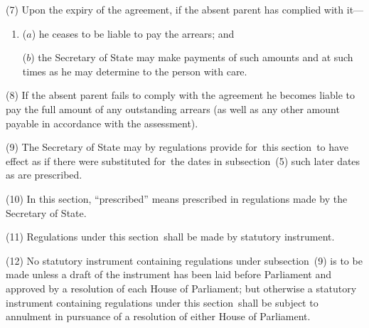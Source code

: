 \documentclass[12pt,a4paper]{article}
\begin{document}
(7) Upon the expiry of the agreement, if the absent parent has complied with it—
\begin{enumerate}\item[]
($a$) he ceases to be liable to pay the arrears; and

($b$) the Secretary of State may make payments of such amounts and at such times as he may determine to the person with care.
\end{enumerate}

(8) If the absent parent fails to comply with the agreement he becomes liable to pay the full amount of any outstanding arrears (as well as any other amount payable in accordance with the assessment).

(9) The Secretary of State may by regulations provide for~this section~to have effect as if there were substituted for~the dates in subsection~(5)  such later dates as are prescribed.

(10) In this section, “prescribed” means prescribed in regulations made by the Secretary of State.

(11) Regulations under this section~shall be made by statutory instrument.

(12) No statutory instrument containing regulations under subsection~(9)  is to be made unless a draft of the instrument has been laid before Parliament and approved by a resolution of each House of Parliament; but otherwise a statutory instrument containing regulations under this section~shall be subject to annulment in pursuance of a resolution of either House of Parliament.

\end{document}
